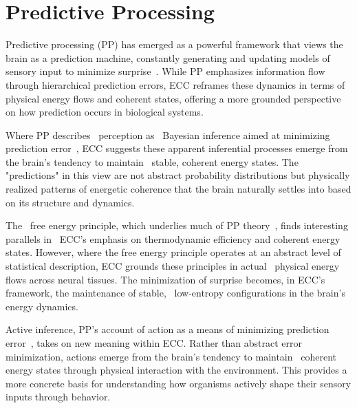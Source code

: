\section{Predictive Processing}

 Predictive processing (PP) has emerged as a powerful framework that views the brain as a prediction machine, constantly generating and updating models of sensory input to minimize surprise~\cite{Clark2013, Friston2020}. While PP emphasizes information flow through hierarchical prediction errors, ECC reframes these dynamics in terms of~ physical energy flows and coherent states, offering a more grounded perspective on how prediction occurs in biological systems.

Where PP describes~ perception as~ Bayesian inference aimed at minimizing prediction error~\cite{Friston2010, Friston2009}, ECC suggests these apparent inferential processes emerge from the brain's tendency to maintain~ stable, coherent energy states. The~ "predictions" in this view are not abstract probability distributions but physically realized patterns of energetic coherence that the brain naturally settles into based on its structure and dynamics.

The~ free energy principle, which underlies much of PP theory~\cite{Friston2009, Friston2010}, finds interesting parallels in~ ECC's emphasis on thermodynamic efficiency and coherent energy states. However, where the free energy principle operates at an abstract level of statistical description, ECC grounds these principles in actual~ physical energy flows across neural tissues. The minimization of surprise becomes, in ECC's framework, the maintenance of stable,~ low-entropy configurations in the brain's energy dynamics.

 Active inference, PP's account of action as a means of minimizing prediction error~\cite{Clark2016, Seth2016}, takes on new meaning within ECC. Rather than abstract error minimization, actions emerge from the brain's tendency to maintain~ coherent energy states through physical interaction with the environment. This provides a more concrete basis for understanding how organisms actively shape their sensory inputs through behavior.

